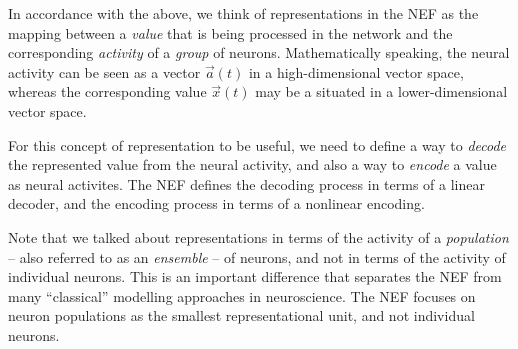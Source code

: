 \documentclass[10pt,letterpaper,oneside]{article}
\begin{document}
In accordance with the above, we think of representations in the NEF as the mapping between a \emph{value} that is being processed in the network and the corresponding \emph{activity} of a \emph{group} of neurons. Mathematically speaking, the neural activity can be seen as a vector $\vec a(t)$ in a high-dimensional vector space, whereas the corresponding value $\vec x(t)$ may be a situated in a lower-dimensional vector space.

For this concept of representation to be useful, we need to define a way to \emph{decode} the represented value from the neural activity, and also a way to \emph{encode} a value as neural activites. The NEF defines the decoding process in terms of a linear decoder, and the encoding process in terms of a nonlinear encoding.

Note that we talked about representations in terms of the activity of a \emph{population} -- also referred to as an \emph{ensemble} -- of neurons, and not in terms of the activity of individual neurons. This is an important difference that separates the NEF from many \enquote{classical} modelling approaches in neuroscience. The NEF focuses on neuron populations as the smallest representational unit, and not individual neurons.

\newpage

\end{document}
